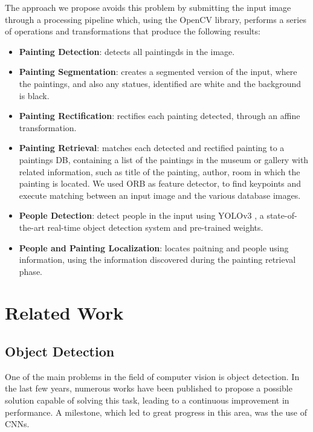 \documentclass[10pt,twocolumn,letterpaper]{article}
\begin{document}
The approach we propose avoids this problem by submitting the input image through a processing pipeline which, using the OpenCV \cite{bradski2008learning} library, performs a series of operations and transformations that produce the following results:
\begin{itemize}
   \item \textbf{Painting Detection}: detects all paintingds in the image.
   \item \textbf{Painting Segmentation}: creates a segmented version of the input, where the paintings, and also any statues, identified are white and the background is black.
   \item \textbf{Painting Rectification}: rectifies each painting detected, through an affine transformation.
   \item \textbf{Painting Retrieval}: matches each detected and rectified painting to a paintings DB, containing a list of the paintings in the museum or gallery with related information, such as title of the painting, author, room in which the painting is located. We used ORB \cite{rublee2011orb} as feature detector, to find keypoints and execute matching between an input image and the various database images.
   \item \textbf{People Detection}: detect people in the input using YOLOv3 \cite{redmon2018yolov3}, a state-of-the-art real-time object detection system and pre-trained weights.
   \item \textbf{People and Painting Localization}: locates paitning and people using information, using the information discovered during the painting retrieval phase.
\end{itemize} 

\section{Related Work}

\subsection{Object Detection}

One of the main problems in the field of computer vision is object detection. In the last few years, numerous works have been published to propose a possible solution capable of solving this task, leading to a continuous improvement in performance. A milestone, which led to great progress in this area, was the use of CNNs.
\end{document}
